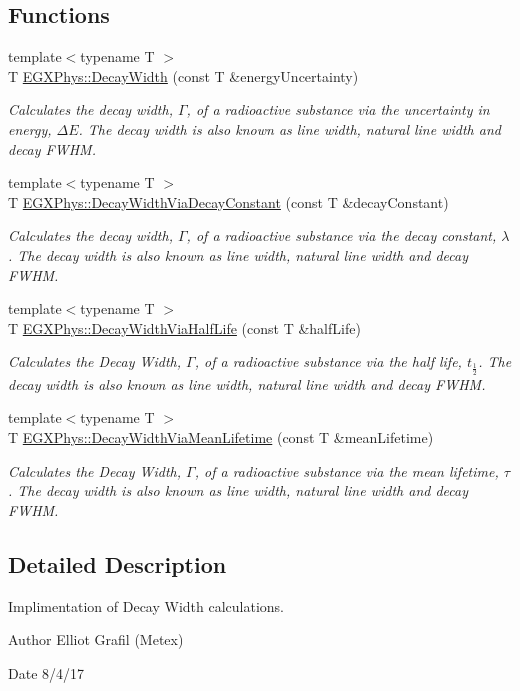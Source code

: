\subsection*{Functions}
\begin{DoxyCompactItemize}
\item 
{\footnotesize template$<$typename T $>$ }\\T \mbox{\hyperlink{group___decay_width_gae232ec8bb39710131be898c057a25620}{E\+G\+X\+Phys\+::\+Decay\+Width}} (const T \&energy\+Uncertainty)
\begin{DoxyCompactList}\small\item\em Calculates the decay width, $\Gamma$, of a radioactive substance via the uncertainty in energy, $\Delta E$. The decay width is also known as line width, natural line width and decay F\+W\+HM. \end{DoxyCompactList}\item 
{\footnotesize template$<$typename T $>$ }\\T \mbox{\hyperlink{group___decay_width_ga143a666966efecc535a59bb4f36a79c6}{E\+G\+X\+Phys\+::\+Decay\+Width\+Via\+Decay\+Constant}} (const T \&decay\+Constant)
\begin{DoxyCompactList}\small\item\em Calculates the decay width, $\Gamma$, of a radioactive substance via the decay constant, $\lambda$. The decay width is also known as line width, natural line width and decay F\+W\+HM. \end{DoxyCompactList}\item 
{\footnotesize template$<$typename T $>$ }\\T \mbox{\hyperlink{group___decay_width_ga1113224b24790a2e34032f9e90ad55c6}{E\+G\+X\+Phys\+::\+Decay\+Width\+Via\+Half\+Life}} (const T \&half\+Life)
\begin{DoxyCompactList}\small\item\em Calculates the Decay Width, $\Gamma$, of a radioactive substance via the half life, $t_{\frac{1}{2}}$. The decay width is also known as line width, natural line width and decay F\+W\+HM. \end{DoxyCompactList}\item 
{\footnotesize template$<$typename T $>$ }\\T \mbox{\hyperlink{group___decay_width_ga0b65d991f3f3d72cf09a4a7b343a01ca}{E\+G\+X\+Phys\+::\+Decay\+Width\+Via\+Mean\+Lifetime}} (const T \&mean\+Lifetime)
\begin{DoxyCompactList}\small\item\em Calculates the Decay Width, $\Gamma$, of a radioactive substance via the mean lifetime, $\tau$. The decay width is also known as line width, natural line width and decay F\+W\+HM. \end{DoxyCompactList}\end{DoxyCompactItemize}


\subsection{Detailed Description}
Implimentation of Decay Width calculations. 

\begin{DoxyAuthor}{Author}
Elliot Grafil (Metex) 
\end{DoxyAuthor}
\begin{DoxyDate}{Date}
8/4/17 
\end{DoxyDate}

